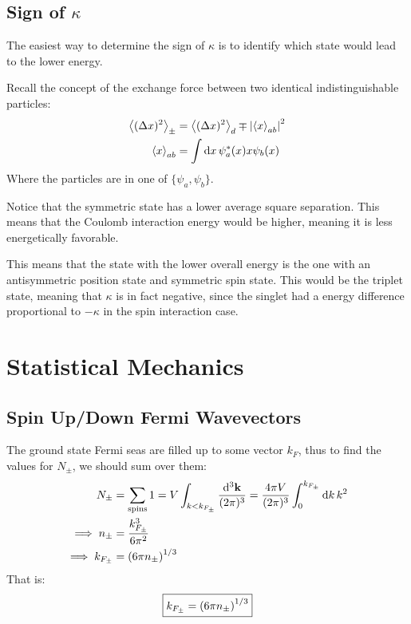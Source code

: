 \documentclass[12pt]{article}
\theoremstyle{plain}
\theoremstyle{definition}
\begin{document}
\subsection{Sign of $\kappa$}
The easiest way to determine the sign of $\kappa$ is to identify which state would lead to the lower energy.

Recall the concept of the exchange force between two identical indistinguishable particles:
\begin{align*}
  \ev{(\Delta x)^2}_\pm&=\ev{(\Delta x)^2}_d\mp\abs{\ev{x}_{ab}}^2\\
  \ev{x}_{ab}&=\int\dd{x}\psi^*_a(x)x\psi_b(x)
\end{align*}
Where the particles are in one of $\{\psi_a,\psi_b\}$.

Notice that the symmetric state has a lower average square separation. This means that the Coulomb interaction energy would be higher, meaning it is less energetically favorable.

This means that the state with the lower overall energy is the one with an antisymmetric position state and symmetric spin state. This would be the triplet state, meaning that $\kappa$ is in fact negative, since the singlet had a energy difference proportional to $-\kappa$ in the spin interaction case. 
\newpage
\section{Statistical Mechanics}
\subsection{Spin Up/Down Fermi Wavevectors}
The ground state Fermi seas are filled up to some vector $k_F$, thus to find the values for $N_\pm$, we should sum over them:
\begin{align*}
  N_\pm&=\sum_{\text{spins}}1=V\int_{k<k_{F_\pm}}\frac{\dd[3]{\vb{k}}}{(2\pi)^3}
  =\frac{4\pi V}{(2\pi)^3}\int_0^{k_{F_\pm}}\dd{k}k^2\\
  \implies n_\pm&=\frac{k_{F_\pm}^3}{6\pi^2}\\
  \implies k_{F_\pm}&=\qty(6\pi n_\pm)^{1/3}
\end{align*}
That is:
\begin{align*}
  \boxed{k_{F_\pm}=\qty(6\pi n_\pm)^{1/3}}
\end{align*}
\end{document}
